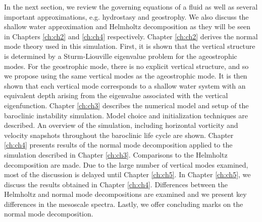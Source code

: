 In the next section, we review the governing equations of a fluid as well as several important approximations, e.g. hydrostasy and geostrophy. We also discuss the shallow water approximation and Helmholtz decomposition as they will be seen in Chapters \ref{ch:ch2} and \ref{ch:ch4} respectively. Chapter \ref{ch:ch2} derives the normal mode theory used in this simulation. First, it is shown that the vertical structure is determined by a Sturm-Liouville eigenvalue problem for the ageostrophic modes. For the geostrophic mode, there is no explicit vertical structure, and so we propose using the same vertical modes as the ageostrophic mode. It is then shown that each vertical mode corresponds to a shallow water system with an equivalent depth arising from the eigenvalue associated with the vertical eigenfunction. Chapter \ref{ch:ch3} describes the numerical model and setup of the baroclinic instability simulation. Model choice and initialization techniques are described. An overview of the simulation, including horizontal vorticity and velocity snapshots throughout the baroclinic life cycle are shown. Chapter \ref{ch:ch4} presents results of the normal mode decomposition applied to the simulation described in Chapter \ref{ch:ch3}. Comparisons to the Helmholtz decomposition are made. Due to the large number of vertical modes examined, most of the discussion is delayed until Chapter \ref{ch:ch5}. In Chapter \ref{ch:ch5}, we discuss the results obtained in Chapter \ref{ch:ch4}. Differences between the Helmholtz and normal mode decompositions are examined and we present key differences in the mesoscale spectra. Lastly, we offer concluding marks on the normal mode decomposition.

